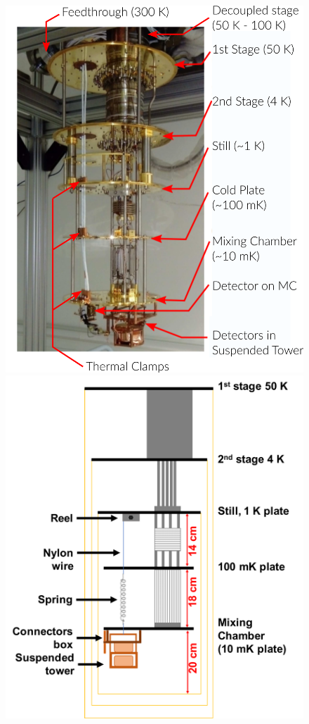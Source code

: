 \begin{figure}
\centering
\begin{minipage}{0.48\textwidth}
	\includegraphics[width=\textwidth]{Figures/Experiment/cryo_photo.png}
\end{minipage}
\hfill
\begin{minipage}{0.48\textwidth}
	\includegraphics[width=\textwidth]{Figures/Experiment/cryo_sketch.pdf}

\end{minipage}
\end{figure}
